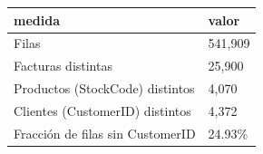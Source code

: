 \begin{tabular}{ll}
\toprule
medida & valor \\
\midrule
Filas & 541,909 \\
Facturas distintas & 25,900 \\
Productos (StockCode) distintos & 4,070 \\
Clientes (CustomerID) distintos & 4,372 \\
Fracción de filas sin CustomerID & 24.93\% \\
\bottomrule
\end{tabular}